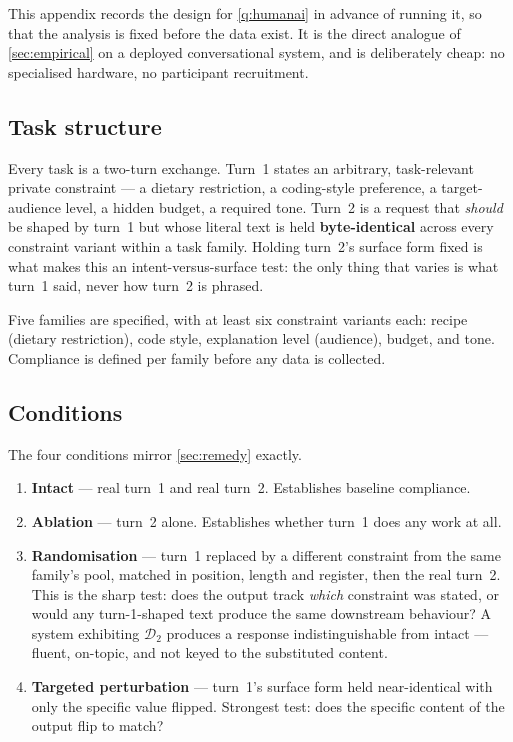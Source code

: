\documentclass[11pt,a4paper]{article}
\theoremstyle{plain}
\theoremstyle{definition}
\theoremstyle{remark}
\newcommand{\Dy}{\mathcal{D}}
\begin{document}
\begin{appendices}
This appendix records the design for \cref{q:humanai} in advance of running it, so that the analysis is fixed
before the data exist. It is the direct analogue of \cref{sec:empirical} on a deployed conversational system,
and is deliberately cheap: no specialised hardware, no participant recruitment.

\subsection{Task structure}

Every task is a two-turn exchange. Turn~1 states an arbitrary, task-relevant private constraint --- a dietary
restriction, a coding-style preference, a target-audience level, a hidden budget, a required tone. Turn~2 is a
request that \emph{should} be shaped by turn~1 but whose literal text is held \textbf{byte-identical} across
every constraint variant within a task family. Holding turn~2's surface form fixed is what makes this an
intent-versus-surface test: the only thing that varies is what turn~1 said, never how turn~2 is phrased.

Five families are specified, with at least six constraint variants each: recipe (dietary restriction), code
style, explanation level (audience), budget, and tone. Compliance is defined per family before any data is
collected.

\subsection{Conditions}

The four conditions mirror \cref{sec:remedy} exactly.

\begin{enumerate}[leftmargin=1.6em, itemsep=2pt]
    \item \textbf{Intact} --- real turn~1 and real turn~2. Establishes baseline compliance.
    \item \textbf{Ablation} --- turn~2 alone. Establishes whether turn~1 does any work at all.
    \item \textbf{Randomisation} --- turn~1 replaced by a different constraint from the same family's pool,
    matched in position, length and register, then the real turn~2. This is the sharp test: does the output
    track \emph{which} constraint was stated, or would any turn-1-shaped text produce the same downstream
    behaviour? A system exhibiting $\Dy_2$ produces a response indistinguishable from intact --- fluent,
    on-topic, and not keyed to the substituted content.
    \item \textbf{Targeted perturbation} --- turn~1's surface form held near-identical with only the specific
    value flipped. Strongest test: does the specific content of the output flip to match?
\end{enumerate}


\end{appendices}
\end{document}
